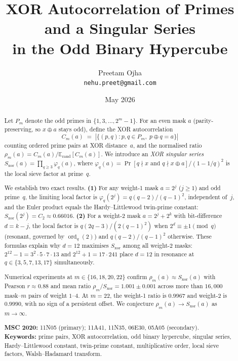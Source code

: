 \documentclass[12pt]{article}
\title{%
  XOR Autocorrelation of Primes and a Singular Series\\
  in the Odd Binary Hypercube
}
\author{
  Preetam Ojha\\
  \texttt{nehu.preet@gmail.com}
}
\date{May 2026}
\begin{document}

\maketitle

\begin{abstract}
Let $P_m$ denote the odd primes in $\{1,3,\ldots,2^m-1\}$.
For an even mask $a$ (parity-preserving, so $x \oplus a$ stays odd),
define the XOR autocorrelation
\[
  C_m(a) \;=\; |\{(p,q) : p,q\in P_m,\; p\oplus q = a\}|
\]
counting ordered prime pairs at XOR distance~$a$, and the normalised ratio
$\rho_m(a) = C_m(a)/\mathbb{E}_{\mathrm{rand}}[C_m(a)]$.
We introduce an \emph{XOR singular series}
$S_{\mathrm{xor}}(a) = \prod_{q\geq 3}\varphi_q(a)$,
where
$\varphi_q(a) = \Pr[q\nmid x \text{ and } q\nmid x\oplus a]/(1-1/q)^2$
is the local sieve factor at prime~$q$.

We establish two exact results.
\textbf{(1)} For any weight-1 mask $a=2^j$ ($j\geq 1$) and odd prime~$q$,
the limiting local factor is
$\varphi_q(2^j) = q(q-2)/(q-1)^2$, independent of~$j$,
and the Euler product equals the Hardy--Littlewood twin-prime constant:
$S_{\mathrm{xor}}(2^j) = C_2 \approx 0.66016$.
\textbf{(2)} For a weight-2 mask $a=2^j+2^k$ with bit-difference $d=k-j$,
the local factor is $q(2q-3)/(2(q-1)^2)$ when $2^d\equiv\pm 1\pmod q$
(resonant, governed by $\operatorname{ord}_q(2)$)
and $q(q-2)/(q-1)^2$ otherwise.
These formulas explain why $d=12$ maximises $S_{\mathrm{xor}}$ among
all weight-2 masks: $2^{12}-1 = 3^2\cdot 5\cdot 7\cdot 13$ and
$2^{12}+1 = 17\cdot 241$ place $d=12$ in resonance at
$q\in\{3,5,7,13,17\}$ simultaneously.

Numerical experiments at $m\in\{16,18,20,22\}$ confirm
$\rho_m(a)\approx S_{\mathrm{xor}}(a)$ with Pearson $r\approx 0.88$
and mean ratio $\rho_m/S_{\mathrm{xor}} = 1.001\pm 0.001$
across more than $16{,}000$ mask--$m$ pairs of weight $1$--$4$.
At $m=22$, the weight-1 ratio is $0.9967$ and weight-2 is $0.9990$,
with no sign of a persistent offset.
We conjecture $\rho_m(a)\to S_{\mathrm{xor}}(a)$ as $m\to\infty$.

\textbf{MSC 2020:} 11N05 (primary); 11A41, 11N35, 06E30, 05A05 (secondary).\\
\textbf{Keywords:} prime pairs, XOR autocorrelation, odd binary hypercube,
singular series, Hardy--Littlewood constant, twin-prime constant,
multiplicative order, local sieve factors, Walsh--Hadamard transform.
\end{abstract}
\end{document}
